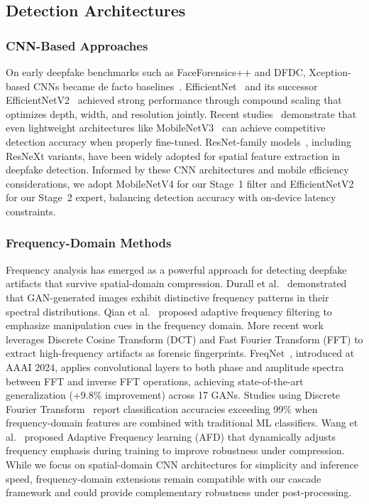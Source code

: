 \subsection*{Detection Architectures}

\subsubsection*{CNN-Based Approaches}
On early deepfake benchmarks such as FaceForensics++ and DFDC, Xception\hyp based CNNs became de facto baselines~\cite{rossler2019faceforensicspp,dolhansky2020dfdc,li2020celebdf}. EfficientNet~\cite{tan2019efficientnet} and its successor EfficientNetV2~\cite{efficientnetv2} achieved strong performance through compound scaling that optimizes depth, width, and resolution jointly. Recent studies~\cite{zhao2022mobilenet_lstm,liu2024lightfakedetect} demonstrate that even lightweight architectures like MobileNetV3~\cite{howard2019mobilenetv3} can achieve competitive detection accuracy when properly fine\hyp tuned. ResNet\hyp family models~\cite{he2016resnet}, including ResNeXt variants, have been widely adopted for spatial feature extraction in deepfake detection. Informed by these CNN architectures and mobile efficiency considerations, we adopt MobileNetV4 for our Stage~1 filter and EfficientNetV2 for our Stage~2 expert, balancing detection accuracy with on\hyp device latency constraints.

\subsubsection*{Frequency-Domain Methods}
Frequency analysis has emerged as a powerful approach for detecting deepfake artifacts that survive spatial-domain compression. Durall et al.~\cite{durall2020watch} demonstrated that GAN-generated images exhibit distinctive frequency patterns in their spectral distributions. Qian et al.~\cite{qian2020thinkingfrequency} proposed adaptive frequency filtering to emphasize manipulation cues in the frequency domain. More recent work~\cite{luo2024freqnet,zhang2024frequency_dct} leverages Discrete Cosine Transform (DCT) and Fast Fourier Transform (FFT) to extract high\hyp frequency artifacts as forensic fingerprints. FreqNet~\cite{luo2024freqnet}, introduced at AAAI 2024, applies convolutional layers to both phase and amplitude spectra between FFT and inverse FFT operations, achieving state\hyp of\hyp the\hyp art generalization (+9.8\% improvement) across 17 GANs. Studies using Discrete Fourier Transform~\cite{jablonski2024dft} report classification accuracies exceeding 99\% when frequency-domain features are combined with traditional ML classifiers. Wang et al.~\cite{wang2022afd} proposed Adaptive Frequency learning (AFD) that dynamically adjusts frequency emphasis during training to improve robustness under compression. While we focus on spatial\hyp domain CNN architectures for simplicity and inference speed, frequency\hyp domain extensions remain compatible with our cascade framework and could provide complementary robustness under post\hyp processing.

